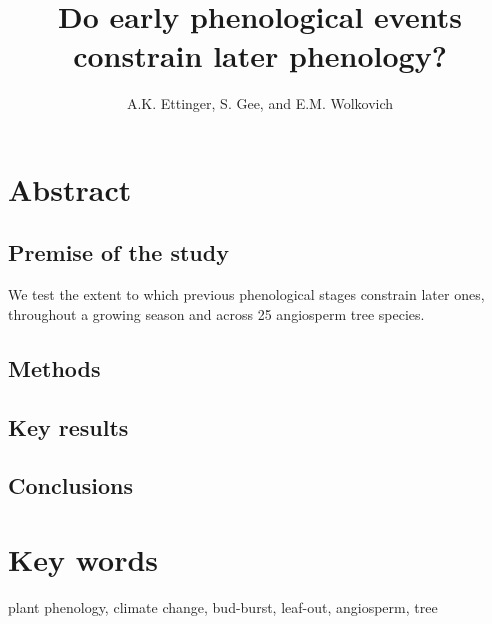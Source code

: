 \documentclass{article}
\begin{document}

\title{Do early phenological events constrain later phenology?} 
\author{A.K. Ettinger, S. Gee, and E.M. Wolkovich}
\maketitle  %


\section*{Abstract}
\subsection*{Premise of the study}
We test the extent to which previous phenological stages constrain later ones, throughout a growing season and across 25 angiosperm tree species. 
\subsection*{Methods}
\subsection*{Key results}
\subsection*{Conclusions}
\section* {Key words}
plant phenology, climate change, bud-burst, leaf-out, angiosperm, tree
\end{document}
